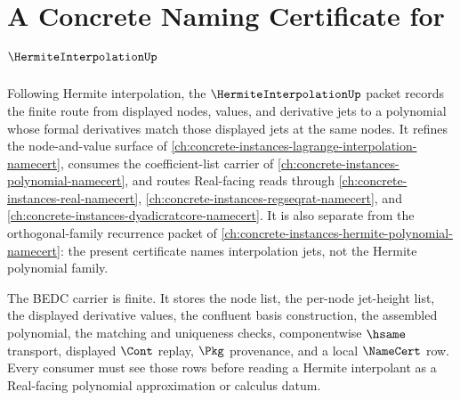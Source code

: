 \chapter{A Concrete Naming Certificate for $\HermiteInterpolationUp$}
\label{ch:concrete-instances-hermite-interpolation-namecert}

Following Hermite interpolation, the $\HermiteInterpolationUp$ packet records the finite route from displayed nodes, values, and derivative jets to a polynomial whose formal derivatives match those displayed jets at the same nodes. It refines the node-and-value surface of \autoref{ch:concrete-instances-lagrange-interpolation-namecert}, consumes the coefficient-list carrier of \autoref{ch:concrete-instances-polynomial-namecert}, and routes Real-facing reads through \autoref{ch:concrete-instances-real-namecert}, \autoref{ch:concrete-instances-regseqrat-namecert}, and \autoref{ch:concrete-instances-dyadicratcore-namecert}. It is also separate from the orthogonal-family recurrence packet of \autoref{ch:concrete-instances-hermite-polynomial-namecert}: the present certificate names interpolation jets, not the Hermite polynomial family.

The BEDC carrier is finite. It stores the node list, the per-node jet-height list, the displayed derivative values, the confluent basis construction, the assembled polynomial, the matching and uniqueness checks, componentwise $\hsame$ transport, displayed $\Cont$ replay, $\Pkg$ provenance, and a local $\NameCert$ row. Every consumer must see those rows before reading a Hermite interpolant as a Real-facing polynomial approximation or calculus datum.

